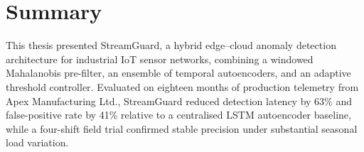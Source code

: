 \section{Summary}
This thesis presented StreamGuard, a hybrid edge--cloud anomaly detection architecture for
industrial IoT sensor networks, combining a windowed Mahalanobis pre-filter, an ensemble of
temporal autoencoders, and an adaptive threshold controller. Evaluated on eighteen months of
production telemetry from Apex Manufacturing Ltd., StreamGuard reduced detection latency by
63\% and false-positive rate by 41\% relative to a centralised LSTM autoencoder baseline,
while a four-shift field trial confirmed stable precision under substantial seasonal load
variation.
